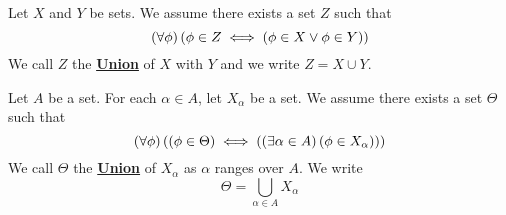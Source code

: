 \newcommand{\SetUnion}[0]{\textbf{\hyperref[def:SetUnion]{Union}}\xspace}
\newcommand{\SetUnions}[0]{\textbf{\hyperref[def:SetUnion]{Unions}}\xspace}
\begin{df}
\label{def:SetUnion}

\rm
    Let $X$ and $Y$ be sets. 
    We assume there exists a set $Z$ such that 
    \begin{equation*}
    \left( \forall \phi\right)\left( \phi \in Z \iff \left( \phi \in X \vee \phi \in Y\right)\right)
    \end{equation*}
    We call $Z$ the \SetUnion of $X$ with $Y$ and we write $Z = X \cup Y$.  


    Let $A$ be a set. 
    For each $\alpha \in A$, let $X_\alpha$ be a set. 
    We assume there exists a set $\Theta$ such that 
    \begin{equation*}
    \left( \forall \phi\right) \left( \left( \phi \in \Theta\right) \iff \left( \left( \exists \alpha \in A\right)\left( \phi \in X_\alpha\right)\right)\right)
    \end{equation*}
    We call $\Theta$ the \SetUnion of $X_{\alpha}$ as $\alpha$ ranges over $A$. 
    We write 
    \begin{equation*}
    \Theta = \bigcup\limits_{\alpha \in A} X_\alpha
    \end{equation*}
\end{df}
